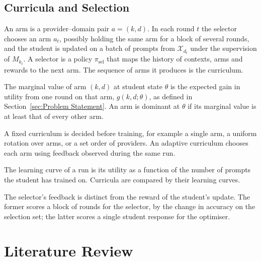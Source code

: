 \subsection{Curricula and Selection}

\begin{Definitions}
An arm is a provider--domain pair $a = (k, d)$. In each round $t$ the selector
chooses an arm $a_t$, possibly holding the same arm for a block of several rounds, and
the student is updated on a batch of prompts from $\mathcal{X}_{d_t}$ under the
supervision of $M_{k_t}$. A selector is a policy $\pi_{\mathrm{sel}}$ that maps the
history of contexts, arms and rewards to the next arm. The sequence of arms it produces
is the curriculum.
\end{Definitions}

\begin{Definitions}
The marginal value of arm $(k, d)$ at student state $\theta$ is the expected gain in
utility from one round on that arm, $g(k, d; \theta)$, as defined in
Section~\ref{sec:Problem Statement}. An arm is dominant at $\theta$ if its marginal
value is at least that of every other arm.
\end{Definitions}

\begin{Definitions}
A fixed curriculum is decided before training, for example a single arm, a uniform
rotation over arms, or a set order of providers. An adaptive curriculum chooses each
arm using feedback observed during the same run.
\end{Definitions}

\begin{Definitions}
The learning curve of a run is its utility as a function of the number of prompts the
student has trained on. Curricula are compared by their learning curves.
\end{Definitions}

The selector's feedback is distinct from the reward of the student's update. The former
scores a block of rounds for the selector, by the change in accuracy on the selection
set; the latter scores a single student response for the optimiser.

\section{Literature Review}
\label{sec:Literature Review}


